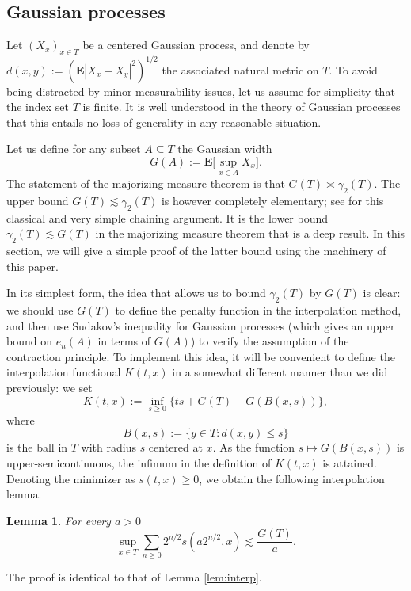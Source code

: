 \documentclass[10pt,reqno]{amsart}
\newtheorem{lem}[thm]{Lemma}
\theoremstyle{definition}
\numberwithin{equation}{section}
\numberwithin{figure}{section}
\numberwithin{table}{section}
\newcommand{\E}{\mathbf{E}}
\begin{document}
\subsection{Gaussian processes}
\label{sec:thm1}

Let $(X_x)_{x\in T}$ be a centered Gaussian process, and denote by 
$d(x,y):=(\E|X_x-X_y|^2)^{1/2}$ the associated natural metric on $T$. To 
avoid being distracted by minor measurability issues, let us assume for 
simplicity that the index set $T$ is finite. It is well understood in the 
theory of Gaussian processes that this entails no loss of generality in 
any reasonable situation.

Let us define for any subset $A\subseteq T$ the Gaussian width
$$
	G(A) := \mathbf{E}\bigg[
	\sup_{x\in A}X_x
	\bigg].
$$
The statement of the majorizing measure theorem is that 
$G(T)\asymp\gamma_2(T)$. The upper bound $G(T)\lesssim\gamma_2(T)$ is 
however completely elementary; see \cite[section 2.2]{Tal14} for this 
classical and very simple chaining argument. It is the lower bound 
$\gamma_2(T)\lesssim G(T)$ in the majorizing measure theorem that is a 
deep result. In this section, we will give a simple proof of the 
latter bound using the machinery of this paper.

In its simplest form, the idea that allows us to bound $\gamma_2(T)$ by 
$G(T)$ is clear: we should use $G(T)$ to define the penalty function in 
the interpolation method, and then use Sudakov's inequality for Gaussian 
processes (which gives an upper bound on $e_n(A)$ in terms of $G(A)$) to 
verify the assumption of the contraction principle.
To implement this idea, it will be convenient to define the interpolation 
functional $K(t,x)$ in a somewhat different manner than we did previously: 
we set
$$
	K(t,x):=\inf_{s\ge 0}\{ ts + G(T)-G(B(x,s))\},
$$
where
$$
	B(x,s) := \{y\in T:d(x,y)\le s\}
$$
is the ball in $T$ with radius 
$s$ centered at $x$. As the function $s\mapsto G(B(x,s))$ is 
upper-semicontinuous, the infimum in the 
definition of $K(t,x)$ is attained. Denoting the minimizer as
$s(t,x)\ge 0$, we obtain the following interpolation lemma.

\begin{lem}
\label{lem:ginterp}
For every $a>0$
$$
	\sup_{x\in T}\sum_{n\ge 0}2^{n/2}s(a2^{n/2},x) \lesssim
	\frac{G(T)}{a}.
$$
\end{lem}

The proof is identical to that of Lemma \ref{lem:interp}.
\end{document}
